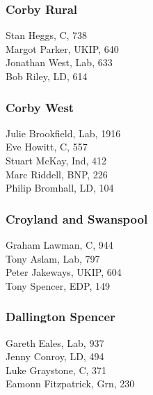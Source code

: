 \documentclass[a4paper,openany,10pt]{book}
\begin{document}
\subsubsection*{Corby Rural}



Stan Heggs, C, 738\\
Margot Parker, UKIP, 640\\
Jonathan West, Lab, 633\\
Bob Riley, LD, 614\\


\subsubsection*{Corby West}



Julie Brookfield, Lab, 1916\\
Eve Howitt, C, 557\\
Stuart McKay, Ind, 412\\
Marc Riddell, BNP, 226\\
Philip Bromhall, LD, 104\\


\subsubsection*{Croyland and Swanspool}



Graham Lawman, C, 944\\
Tony Aslam, Lab, 797\\
Peter Jakeways, UKIP, 604\\
Tony Spencer, EDP, 149\\


\subsubsection*{Dallington Spencer}



Gareth Eales, Lab, 937\\
Jenny Conroy, LD, 494\\
Luke Graystone, C, 371\\
Eamonn Fitzpatrick, Grn, 230\\
\end{document}
